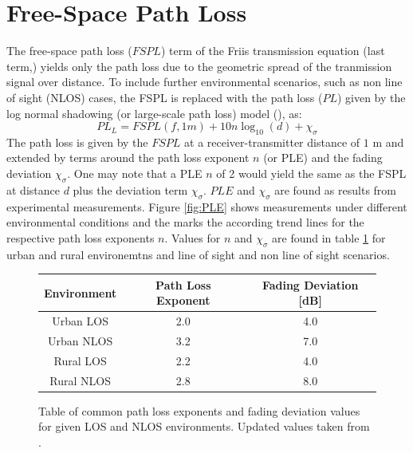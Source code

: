 \section{Free-Space Path Loss}
The free-space path loss ($FSPL$) term of the Friis transmission equation (last term,\cite{sklar2001digital}) 
yields only the path loss due to the geometric spread of the tranmission signal over distance. To include
further environmental scenarios, such as non line of sight (NLOS) cases, the FSPL 
is replaced with the path loss ($PL$) given by the log normal shadowing (or 
large-scale path loss) model (\cite{seidel1991path}), as:
\begin{equation} \label{eq:pl-log}
    PL_L = FSPL(f, 1m) + 10 n \log_{10}(d) + \chi_{\sigma}
\end{equation}
The path loss is given by the $FSPL$ at a receiver-transmitter distance of $1$ m and 
extended by terms around the path loss exponent $n$ (or PLE) and the
fading deviation $\chi_{\sigma}$. One may note that a PLE $n$ of 2 would yield
the same as the FSPL at distance $d$ plus the deviation term $\chi_{\sigma}$. 
$PLE$ and $\chi_{\sigma}$ are found as results from experimental measurements. 
Figure \ref{fig:PLE} shows measurements under different environmental conditions
and the marks the according trend lines for the respective path loss exponents $n$. 
Values for $n$ and $\chi_{\sigma}$ are found in table \ref{tab:ple} for urban and rural environemtns
and line of sight and non line of sight scenarios. 

\begin{figure}[htb]
\begin{center}
    \begin{tabular}{ c | c | c }
        Environment & Path Loss Exponent & Fading Deviation [dB] \\
        \hline
        \hline
        Urban LOS & 2.0 & 4.0 \\
        \hline
        Urban NLOS & 3.2 & 7.0 \\
        \hline
        Rural LOS & 2.2 & 4.0 \\
        \hline
        Rural NLOS & 2.8 & 8.0 \\
        \hline
    \end{tabular}
    \caption{Table of common path loss exponents and fading deviation values for given LOS and NLOS environments. 
    Updated values taken from \cite{sun2017novel}.}
    \label{tab:ple}
\end{center}
\end{figure}

